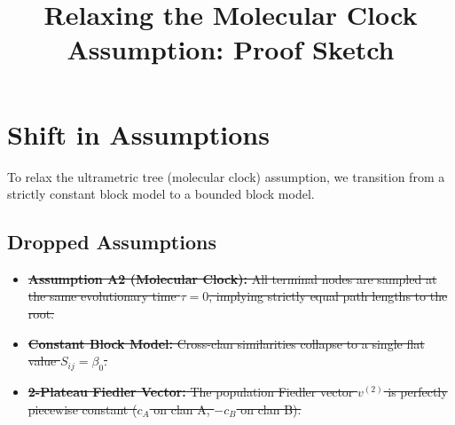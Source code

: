 \documentclass{article}
\title{Relaxing the Molecular Clock Assumption: Proof Sketch}
\author{}
\date{}
\begin{document}
\maketitle

\section{Shift in Assumptions}

To relax the ultrametric tree (molecular clock) assumption, we transition from a strictly constant block model to a bounded block model.

\subsection*{Dropped Assumptions}
\begin{itemize}
    \item \sout{\textbf{Assumption A2 (Molecular Clock):} All terminal nodes are sampled at the same evolutionary time $\tau=0$, implying strictly equal path lengths to the root.}
    \item \sout{\textbf{Constant Block Model:} Cross-clan similarities collapse to a single flat value $S_{ij} = \beta_0$.}
    \item \sout{\textbf{2-Plateau Fiedler Vector:} The population Fiedler vector $v^{(2)}$ is perfectly piecewise constant ($c_A$ on clan A, $-c_B$ on clan B).}
\end{itemize}
\end{document}
